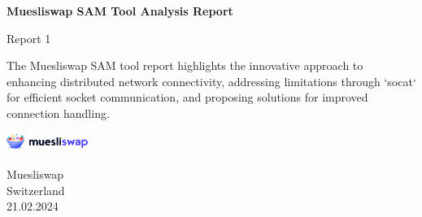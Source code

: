 \begin{titlepage}
   \begin{center}
       \vspace*{1cm}

       \Huge
       \textbf{Muesliswap SAM Tool Analysis Report}

       \vspace{0.5cm}
       \Large
            Report 1
       \vspace{1.5cm}

       \vfill
            
       The Muesliswap SAM tool report highlights the innovative approach to enhancing distributed network connectivity, addressing limitations through `socat` for efficient socket communication, and proposing solutions for improved connection handling.

       \vspace{0.8cm}
     
       \includegraphics[width=0.2\textwidth]{muesliswap_logo.png}
            
       Muesliswap\\
       Switzerland\\
       21.02.2024
            
   \end{center}
\end{titlepage}
